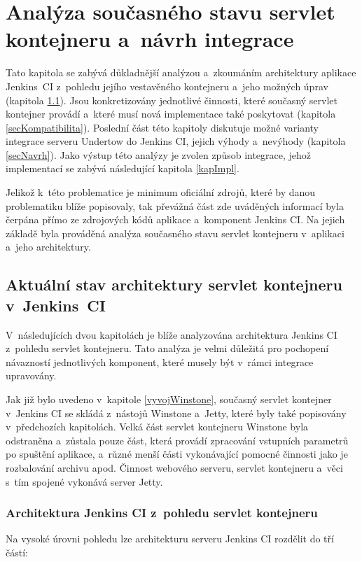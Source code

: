 \chapter{Analýza současného stavu servlet kontejneru a~návrh integrace} \label{kapAnalyza}
    Tato kapitola se zabývá důkladnější analýzou a~zkoumáním architektury aplikace Jenkins~CI
    z~pohledu jejího vestavěného kontejneru a~jeho možných úprav (kapitola \ref{secArchitecture}). 
    Jsou konkretizovány jednotlivé činnosti, které současný servlet kontejner provádí
    a~které musí nová implementace také poskytovat (kapitola \ref{secKompatibilita}).
    Poslední část této kapitoly diskutuje možné varianty integrace serveru Undertow do Jenkins CI,
    jejich výhody a~nevýhody (kapitola \ref{secNavrh}). Jako výstup této analýzy je zvolen způsob integrace, jehož
    implementací se zabývá následující kapitola \ref{kapImpl}.

    Jelikož k~této problematice je minimum oficiální zdrojů, které by danou problematiku blíže popisovaly, 
    tak převážná část zde uváděných informací byla čerpána přímo ze zdrojových kódů aplikace a~komponent Jenkins CI.
    Na jejich základě byla prováděná analýza současného stavu servlet kontejneru v~aplikaci a~jeho architektury.
    
    \section{Aktuální stav architektury servlet kontejneru v~Jenkins~CI}\label{secArchitecture}
        V~následujících dvou kapitolách je blíže analyzována architektura
        Jenkins CI z~pohledu servlet kontejneru. Tato analýza je velmi důležitá
        pro pochopení návazností jednotlivých komponent, které musely být v~rámci integrace upravovány.

        Jak již bylo uvedeno v~kapitole \ref{vyvojWinstone}, současný servlet kontejner 
        v~Jenkins CI se skládá z~nástojů Winstone a~Jetty, které byly také popisovány
        v~předchozích kapitolách. Velká část servlet
        kontejneru Winstone byla odstraněna a~zůstala pouze část, která
        provádí zpracování vstupních parametrů po spuštění aplikace, a~různé menší části
        vykonávající pomocné činnosti jako je rozbalování archivu apod. Činnost webového serveru, servlet kontejneru
        a~věci s~tím spojené vykonává server Jetty.
        

        \subsection{Architektura Jenkins CI z~pohledu servlet kontejneru} 
            Na vysoké úrovni pohledu lze architekturu serveru Jenkins CI rozdělit do tří částí:
            
